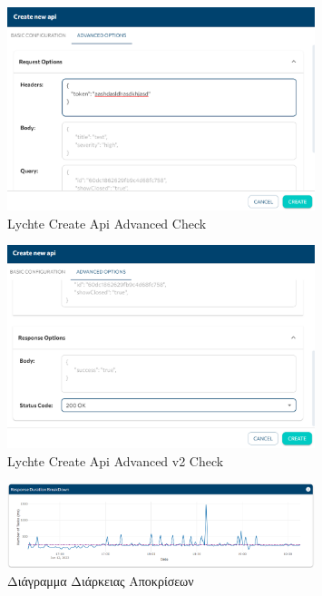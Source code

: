 \begin{figure}[!ht]
	\centering
	\includegraphics[width=0.8\textwidth]{./images/chapter5/api_creation_advanced_features.png}
	\caption[Lychte Create Api Advanced Check]{Lychte Create Api Advanced Check}
	\label{fig:lychte_create_advanced_api}
\end{figure}

\begin{figure}[!ht]
	\centering
	\includegraphics[width=0.8\textwidth]{./images/chapter5/api_creation_advanced_features_v2.png}
	\caption[Lychte Create Api Advanced v2 Check]{Lychte Create Api Advanced v2 Check}
	\label{fig:lychte_create_advanced_v2_api}
\end{figure}

\begin{figure}[!ht]
	\centering
	\includegraphics[width=0.8\textwidth]{./images/chapter5/response_duration_breakdown.png}
	\caption[Διάγραμμα Διάρκειας Αποκρίσεων]{Διάγραμμα Διάρκειας Αποκρίσεων}
	\label{fig:lychte_response_duration_breakdown}
\end{figure}

